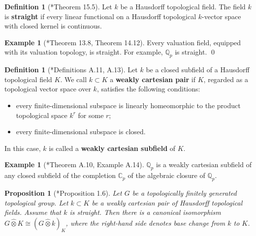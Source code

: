 \documentclass[11pt]{amsart}
\newtheorem{proposition}[theorem]{Proposition}
\theoremstyle{definition}
\newtheorem{definition}[theorem]{Definition}
\newtheorem{example}[theorem]{Example}
\numberwithin{equation}{section}
\numberwithin{equation}{section}
\newcommand\QQ{\mathbb{Q}}
\newcommand\CC{\mathbb{C}}
\begin{document}
\begin{definition}[\cite{Warner-topological-rings}*{Theorem 15.5}]\label{Fact: properties of straight topological field}
Let $k$ be a Hausdorff topological field. The field $k$ is \textbf{straight} if every linear functional on a Hausdorff topological $k$-vector space with closed kernel is continuous.
\end{definition}

\begin{example}[\cite{Warner-topological-rings}*{Theorem 13.8, Theorem 14.12}]\label{Example: Valution fields are straight}
Every valuation field, equipped with its valuation topology, is straight. For example, $\QQ_p$ is straight. \qed
\end{example}

\begin{definition}[\cite{Hu-Wang-continuou-Malcev-completion}*{Definitions A.11, A.13}]\label{Def: weakly cartesian subfield}
Let $k$ be a closed subfield of a Hausdorff topological field $K$. We call $k\subset K$ a \textbf{weakly cartesian pair} if $K$, regarded as a topological vector space over $k$, satisfies the following conditions:
\begin{itemize}[leftmargin=0.25in]
    \item every finite-dimensional subspace is linearly homeomorphic to the product topological space $k^r$ for some $r$;
    \item every finite-dimensional subspace is closed.
\end{itemize}
In this case, $k$ is called a \textbf{weakly cartesian subfield} of $K$.
\end{definition}

\begin{example}[\cite{Hu-Wang-continuou-Malcev-completion}*{Theorem A.10, Example A.14}]\label{Example: weakly cartesian pair}
$\QQ_p$ is a weakly cartesian subfield of any closed subfield of the completion $\CC_p$ of the algebraic closure of $\QQ_p$. 
\end{example}

\begin{proposition}[\cite{Hu-Wang-continuou-Malcev-completion}*{Proposition 1.6}]\label{Prop: base change of Malcev completion}
Let $G$ be a topologically finitely generated topological group. Let $k\subset K$ be a weakly cartesian pair of Hausdorff topological fields. Assume that $k$ is straight. Then there is a canonical isomorphism $G\widehat{\otimes}K \cong (G\widehat{\otimes} k)_K$, where the right-hand side denotes base change from $k$ to $K$.
\end{proposition}
\end{document}

